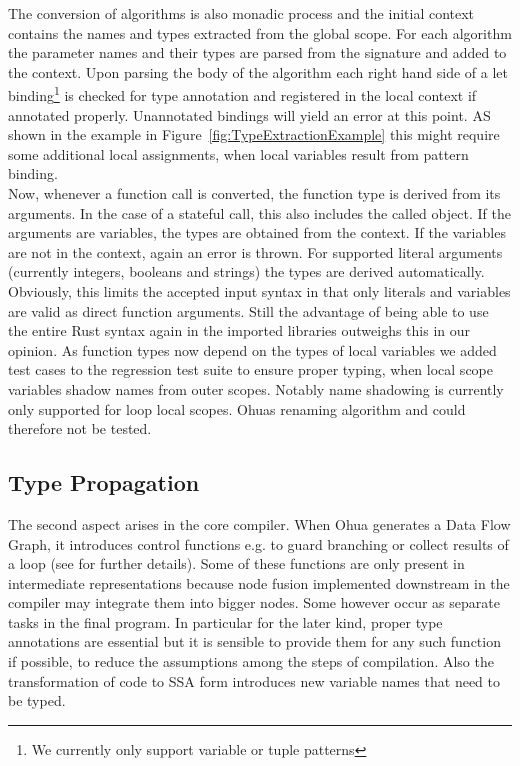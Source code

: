 The conversion of algorithms is also monadic process and the initial context contains the names and types extracted from the global scope. For each algorithm the parameter names and their types are parsed from the signature and added to the context. Upon parsing the body of the algorithm each right hand side of a let binding\footnote{We currently only support variable or tuple patterns} is checked for type annotation and registered in the local context if annotated properly. Unannotated bindings will yield an error at this point. AS shown in the example in Figure~\ref{fig:TypeExtractionExample} this might require some additional local assignments, when local variables result from pattern binding.\\

Now, whenever a function call is converted, the function type is derived from its arguments. In the case of a stateful call, this also includes the called object. If the arguments are variables, the types are obtained from the context. If the variables are not in the context, again an error is thrown. For supported literal arguments (currently integers, booleans and strings) the types are derived automatically. Obviously, this limits the accepted input syntax in that only literals and variables are valid as direct function arguments. Still the advantage of being able to use the entire Rust syntax again in the imported libraries outweighs this in our opinion. As function types now depend on the types of local variables we added test cases to the regression test suite to ensure proper typing, when local scope variables shadow names from outer scopes. Notably name shadowing is currently only supported for loop local scopes.  Ohuas renaming algorithm and could therefore not be tested.\\

\subsection{Type Propagation}
The second aspect arises in the core compiler. When Ohua generates a Data Flow Graph, it introduces control functions e.g. to guard branching or collect results of a loop (see \cite{ertel2018compiling} for further details). Some of these functions are only present in intermediate representations because node fusion implemented downstream in the compiler may integrate them into bigger nodes. Some however occur as separate tasks in the final program. In particular for the later kind, proper type annotations are essential but it is sensible to provide them for any such function if possible, to reduce the assumptions among the steps of compilation. Also the transformation of code to SSA form introduces new variable names that need to be typed.\\

